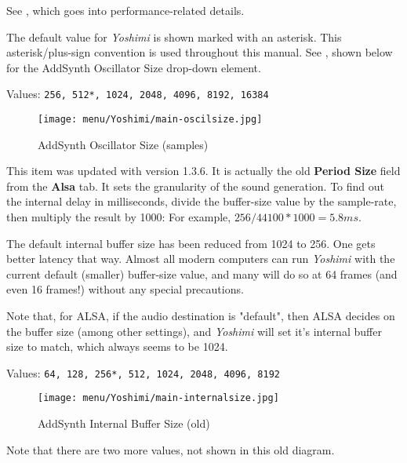    See , which
   goes into performance-related details.

   The default value for \textsl{Yoshimi} is shown marked with an asterisk.
   This asterisk/plus-sign convention is used throughout this manual.
   See ,
   shown below for the AddSynth Oscillator Size drop-down element.

   Values: \texttt{256, 512*, 1024, 2048, 4096, 8192, 16384}

\begin{figure}[H]
   \centering
   \texttt{[image: menu/Yoshimi/main-oscilsize.jpg]}
   \caption[OscilSize Values]{AddSynth Oscillator Size (samples)}
   \label{fig:yoshimi_oscilsize_values}
\end{figure}

   This item was updated with version 1.3.6.  It is actually the old
   \textbf{Period Size} field from the \textbf{Alsa} tab.
   It sets the granularity of the sound generation.
   To find out the internal delay in milliseconds, divide the
   buffer-size value by the sample-rate, then multiply the result by 1000:
   For example, \(256 / 44100 * 1000 = 5.8 ms\).

   The default internal buffer size has been reduced from 1024 to 256.  One
   gets better latency that way.  Almost all modern computers can run
   \textsl{Yoshimi} with the current default (smaller) buffer-size value, and
   many will do so at 64 frames (and even 16 frames!)
   without any special precautions.

   Note that, for ALSA, if the audio destination is "default",
   then ALSA decides on the buffer size (among other settings), and
   \textsl{Yoshimi} will set it's internal buffer size to match,
   which always seems to be 1024.

   Values: \texttt{64, 128, 256*, 512, 1024, 2048, 4096, 8192}

\begin{figure}[H]
   \centering
   \texttt{[image: menu/Yoshimi/main-internalsize.jpg]}
   \caption[Internal Size Values]{AddSynth Internal Buffer Size (old)}
   \label{fig:yoshimi_internalsize_values}
\end{figure}

   Note that there are two more values, not shown in this old diagram.

